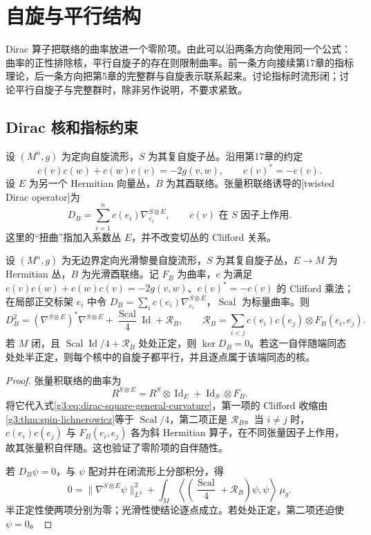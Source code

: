 \section{自旋与平行结构}
\label{g3:sec:B03}

Dirac 算子把联络的曲率放进一个零阶项。由此可以沿两条方向使用同一个公式：曲率的正性排除核，平行自旋子的存在则限制曲率。前一条方向接续第17章的指标理论，后一条方向把第5章的完整群与自旋表示联系起来。讨论指标时流形闭；讨论平行自旋子与完整群时，除非另作说明，不要求紧致。

\subsection{Dirac 核和指标约束}
\label{g3:subsec:B03:01}

设 \((M^n,g)\) 为定向自旋流形，\(S\) 为其复自旋子丛。沿用第17章的约定
\[
 c(v)c(w)+c(w)c(v)=-2g(v,w),\qquad c(v)^*=-c(v).
\]
设 \(E\) 为另一个 Hermitian 向量丛，\(B\) 为其酉联络。张量积联络诱导的[twisted Dirac operator]为
\[
 D_B=\sum_{i=1}^n c(e_i)\nabla^{S\otimes E}_{e_i},
 \qquad c(v)\text{ 在 }S\text{ 因子上作用}.
\]
这里的“扭曲”指加入系数丛 \(E\)，并不改变切丛的 Clifford 关系。

\begin{proposition}\label{g3:prop:B-twisted-lichnerowicz}
 设 \((M^n,g)\) 为无边界定向光滑黎曼自旋流形，\(S\) 为其复自旋子丛，\(E\to M\) 为 Hermitian 丛，\(B\) 为光滑酉联络。记 \(F_B\) 为曲率，\(c\) 为满足 \(c(v)c(w)+c(w)c(v)=-2g(v,w)\)、\(c(v)^*=-c(v)\) 的 Clifford 乘法；在局部正交标架 \(e_i\) 中令 \(D_B=\sum_i c(e_i)\nabla^{S\otimes E}_{e_i}\)，\(\operatorname{Scal}\) 为标量曲率。则
 \begin{equation}\label{g3:eq:B-twisted-lichnerowicz}
  D_B^2=(\nabla^{S\otimes E})^*\nabla^{S\otimes E}
   +\frac{\operatorname{Scal}}4\operatorname{Id}+\mathcal R_B,
  \qquad
  \mathcal R_B=\sum_{i<j}c(e_i)c(e_j)\otimes F_B(e_i,e_j).
 \end{equation}
 若 \(M\) 闭，且 \(\operatorname{Scal}\operatorname{Id}/4+\mathcal R_B\) 处处正定，则 \(\ker D_B=0\)。若这一自伴随端同态处处半正定，则每个核中的自旋子都平行，并且逐点属于该端同态的核。
\end{proposition}
\begin{proof}
 张量积联络的曲率为
 \[
 R^{S\otimes E}=R^S\otimes\operatorname{Id}_E
   +\operatorname{Id}_S\otimes F_B.
 \]
 将它代入式\eqref{g3:eq:dirac-square-general-curvature}，第一项的 Clifford 收缩由\cref{g3:thm:spin-lichnerowicz}等于 \(\operatorname{Scal}/4\)，第二项正是 \(\mathcal R_B\)。当 \(i\ne j\) 时，\(c(e_i)c(e_j)\) 与 \(F_B(e_i,e_j)\) 各为斜 Hermitian 算子，在不同张量因子上作用，故其张量积自伴随。这也验证了零阶项的自伴随性。

 若 \(D_B\psi=0\)，与 \(\psi\) 配对并在闭流形上分部积分，得
 \[
  0=\|\nabla^{S\otimes E}\psi\|_{L^2}^2
   +\int_M\left\langle
       \left(\frac{\operatorname{Scal}}4+\mathcal R_B\right)\psi,\psi
     \right\rangle\,\mu_g.
 \]
 半正定性使两项分别为零；光滑性使结论逐点成立。若处处正定，第二项还迫使 \(\psi=0\)。
\end{proof}

